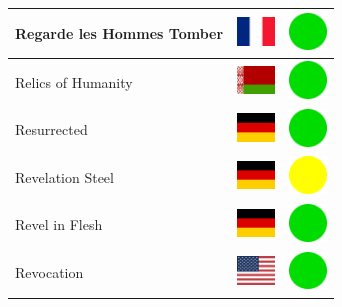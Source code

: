 \documentclass[12pt, a4paper, twoside]{report}
\begin{document}
\begin{center}
\begin{longtable}{|p{5cm}|p{2cm}|p{2cm}|}
 Regarde les Hommes Tomber                                  & \includegraphics[width=1cm]{../4x3/fr} &   \includegraphics[width=1cm]{../likes/y} \\ \hline
 Relics of Humanity                                         & \includegraphics[width=1cm]{../4x3/by} &   \includegraphics[width=1cm]{../likes/y} \\ \hline
 Resurrected                                                & \includegraphics[width=1cm]{../4x3/de} &   \includegraphics[width=1cm]{../likes/y} \\ \hline
 Revelation Steel                                           & \includegraphics[width=1cm]{../4x3/de} &   \includegraphics[width=1cm]{../likes/m} \\ \hline
 Revel in Flesh                                             & \includegraphics[width=1cm]{../4x3/de} &   \includegraphics[width=1cm]{../likes/y} \\ \hline
 Revocation                                                 & \includegraphics[width=1cm]{../4x3/us} &   \includegraphics[width=1cm]{../likes/y} \\ \hline

\end{longtable}
\end{center}
\end{document}
